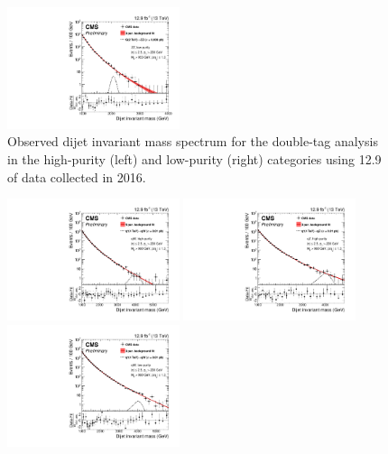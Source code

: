 \begin{figure}[h!]
\includegraphics[width=0.45\textwidth]{figures/analysis/search2/B2G-16-021/figures/mjj/MLBkgFit_DijetMassLowPuriZZ.pdf}
\caption{Observed dijet invariant mass spectrum for the double-tag analysis in the high-purity (left) and low-purity (right) categories using 12.9 \fbinv of data collected in 2016.}
\label{fig:searchII:doubleobsmvv}
\end{figure}
\begin{figure}[h!]
\centering
\includegraphics[width=0.45\textwidth]{figures/analysis/search2/B2G-16-021/figures/mjj/MLBkgFit_DijetMassHighPuriqW.pdf}
\includegraphics[width=0.45\textwidth]{figures/analysis/search2/B2G-16-021/figures/mjj/MLBkgFit_DijetMassHighPuriqZ.pdf}\\
\includegraphics[width=0.45\textwidth]{figures/analysis/search2/B2G-16-021/figures/mjj/MLBkgFit_DijetMassLowPuriqW.pdf}

\end{figure}

